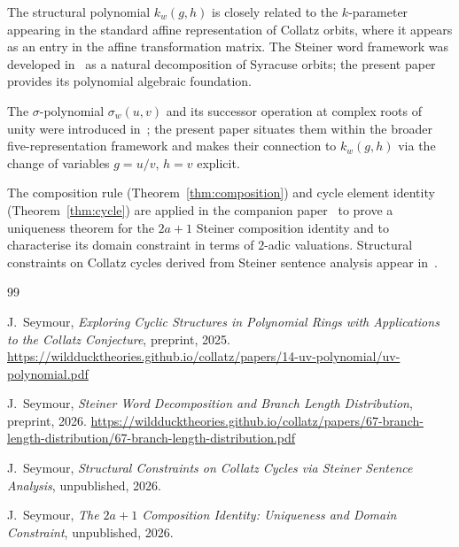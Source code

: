 \documentclass[12pt]{article}
\theoremstyle{definition}
\theoremstyle{remark}
\newcommand{\kpoly}{k}
\begin{document}
The structural polynomial $\kpoly_w(g,h)$ is closely related to the
$k$-parameter appearing in the standard affine representation of Collatz
orbits, where it appears as an entry in the affine transformation matrix.
The Steiner word framework was developed
in~\cite{paper67} as a natural decomposition of Syracuse orbits; the present
paper provides its polynomial algebraic foundation.

The $\sigma$-polynomial $\sigma_w(u,v)$ and its successor operation at complex
roots of unity were introduced in~\cite{paper14}; the present paper situates
them within the broader five-representation framework and makes their
connection to $\kpoly_w(g,h)$ via the change of variables $g = u/v$, $h = v$
explicit.

The composition rule (Theorem~\ref{thm:composition}) and cycle element identity
(Theorem~\ref{thm:cycle}) are applied in the companion paper~\cite{paper73} to
prove a uniqueness theorem for the $2a+1$ Steiner composition identity and to
characterise its domain constraint in terms of $2$-adic valuations.
Structural constraints on Collatz cycles derived from Steiner sentence analysis
appear in~\cite{paper68}.

\begin{thebibliography}{99}

J.\ Seymour,
\textit{Exploring Cyclic Structures in Polynomial Rings with Applications to the Collatz Conjecture},
preprint, 2025.
\url{https://wildducktheories.github.io/collatz/papers/14-uv-polynomial/uv-polynomial.pdf}

J.\ Seymour,
\textit{Steiner Word Decomposition and Branch Length Distribution},
preprint, 2026.
\url{https://wildducktheories.github.io/collatz/papers/67-branch-length-distribution/67-branch-length-distribution.pdf}

J.\ Seymour,
\textit{Structural Constraints on Collatz Cycles via Steiner Sentence Analysis},
unpublished, 2026.

J.\ Seymour,
\textit{The $2a+1$ Composition Identity: Uniqueness and Domain Constraint},
unpublished, 2026.

\end{thebibliography}
\end{document}
